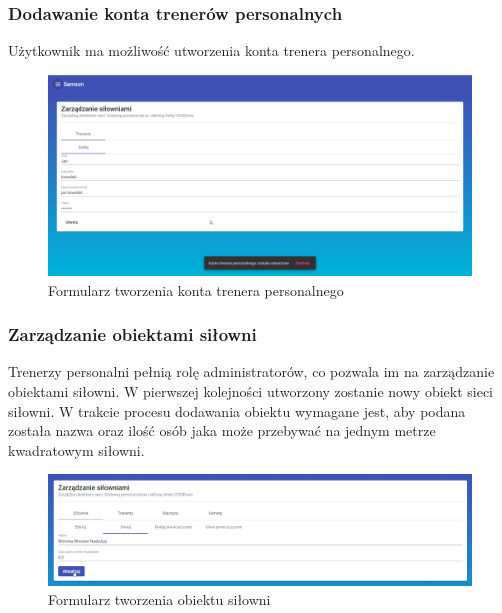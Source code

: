 \documentclass[a4paper,twoside,12pt]{book}
\begin{document}
\subsubsection{Dodawanie konta trenerów personalnych}
Użytkownik ma możliwość utworzenia konta trenera personalnego.
\begin{figure}[H]
	\centering
	\includegraphics[width=1\linewidth]{../zrzuty_ekranu/dzialanie/trener_personalny/tworzenie_konta_trenera_personalnego}
	\caption{Formularz tworzenia konta trenera personalnego}
	\label{fig:tworzeniekontatrenerapersonalnego}
\end{figure}

\subsubsection{Zarządzanie obiektami siłowni}
Trenerzy personalni pełnią rolę administratorów, co pozwala im na zarządzanie obiektami siłowni.
W pierwszej kolejności utworzony zostanie nowy obiekt sieci siłowni. W trakcie procesu dodawania obiektu wymagane jest, aby podana została nazwa oraz ilość osób jaka może przebywać na jednym metrze kwadratowym siłowni.
\begin{figure}[H]
	\centering
	\includegraphics[width=1\linewidth]{../zrzuty_ekranu/dzialanie/obiekty/tworzenie}
	\caption{Formularz tworzenia obiektu siłowni}
	\label{fig:tworzenie}
\end{figure}
\end{document}
